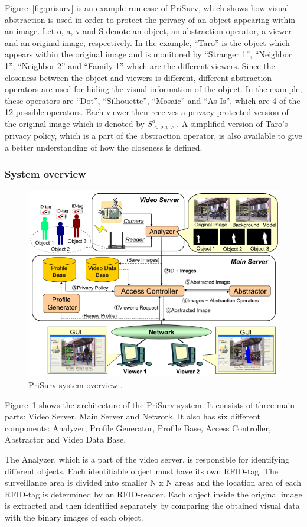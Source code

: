 \documentclass[conference]{IEEEtran}
\begin{document}
Figure~\ref{fig:prisurv} is an example run case of PriSurv, which shows how visual abstraction is used in order to protect the privacy of an object appearing within an image. Let o, a, v and S denote an object, an abstraction operator, a viewer and an original image, respectively. In the example, “Taro” is the object which appears within the original image and is monitored by “Stranger 1”, “Neighbor 1”, “Neighbor 2” and “Family 1” which are the different viewers. Since the closeness between the object and viewers is different, different abstraction operators are used for hiding the visual information of the object. In the example, these operators are “Dot”, “Silhouette”, “Mosaic” and “As-Is”, which are 4 of the 12 possible operators. Each viewer then receives a privacy protected version of the original image which is denoted by $S_{<o, v>}^a$. A simplified version of Taro’s privacy policy, which is a part of the abstraction operator, is also available to give a better understanding of how the closeness is defined. 

\subsubsection{System overview}

\begin{figure}[t]
\centerline{\includegraphics[width=.5\textwidth]{img//prisurv_arch.png}}
\caption{PriSurv system overview \cite{chinomi2008PriSurv}.}
\label{fig:prisurv2}
\end{figure}

Figure~\ref{fig:prisurv2} shows the architecture of the PriSurv system. It consists of three main parts: Video Server, Main Server and Network. It also has six different components: Analyzer, Profile Generator, Profile Base, Access Controller, Abstractor and Video Data Base. 

The Analyzer, which is a part of the video server, is responsible for identifying different objects. Each identifiable object must have its own \ac{RFID}-tag. The surveillance area is divided into smaller N x N areas and the location area of each \ac{RFID}-tag is determined by an \ac{RFID}-reader. Each object inside the original image is extracted and then identified separately by comparing the obtained visual data with the binary images of each object. 
\end{document}
